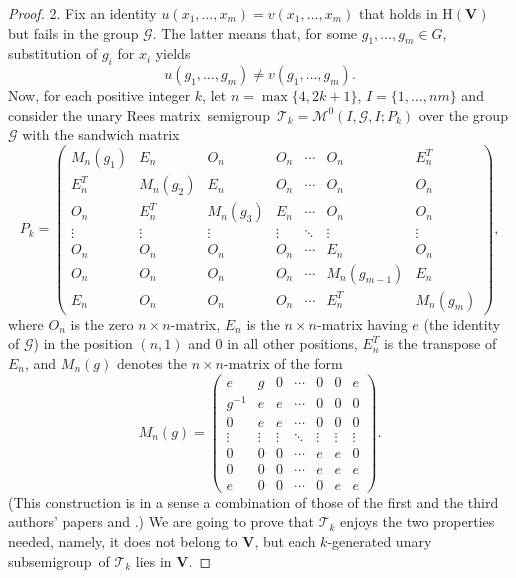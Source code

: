 \documentclass[11pt,reqno]{amsart}
\numberwithin{equation}{section}
\theoremstyle{remark}
\def\cal{\mathcal}
\def\Mc{{\cal M}}
\def\Vc{\mathbf{V}}
\def\H{\mathrm H}
\def\Rm{Rees matrix}
\def\sm{semi\-group}
\def\id{identit}
\begin{document}
\begin{proof}
 2. Fix an \id y $u(x_1,\ldots,x_m) = v(x_1,\ldots,x_m)$ that holds in ${\H(\Vc)}$
but fails in the group $\mathcal{G}$. The latter means that, for
some $g_1,\dots,g_m\in G$, substitution of $g_i$ for $x_i$ yields
\begin{equation}\label{2.1}
u(g_1,\ldots,g_m) \ne v(g_1,\ldots,g_m).
\end{equation}
Now, for each positive integer $k$, let $n =\max\{4,2k+1\}$,
$I=\{1,\dots,nm\}$ and consider the unary \Rm\ \sm \
$\mathcal{T}_k=\Mc^0(I,\mathcal{G},I;P_k)$ over the group
$\mathcal{G}$ with the sandwich matrix
$$P_k=\left(\begin{array}{ccccccc}
M_n(g_1) & E_n & O_n & O_n & \cdots & O_n & E_n^T \\
E_n^T & M_n(g_2) & E_n & O_n & \cdots & O_n & O_n \\
O_n & E_n^T & M_n(g_3) & E_n & \cdots & O_n & O_n \\
\vdots & \vdots & \vdots & \vdots & \ddots & \vdots & \vdots \\
O_n & O_n & O_n & O_n & \cdots & E_n & O_n\\
O_n & O_n & O_n & O_n & \cdots & M_n(g_{m-1}) & E_n \\
E_n & O_n & O_n & O_n & \cdots & E_n^T & M_n(g_m)
\end{array}\right),$$
where $O_n$ is the zero $n\times n$-matrix, $E_n$ is the $n\times
n$-matrix having $e$ (the identity of $\mathcal{G}$) in the
position $(n,1)$ and 0 in all other positions, $E_n^T$ is the
transpose of $E_n$, and $M_n(g)$ denotes the $n\times n$-matrix of
the form
$$M_n(g)=\left(\begin{array}{ccccccc}
e & g &  0 & \cdots & 0 & 0 & e \\
g^{-1} & e & e & \cdots & 0 & 0 & 0 \\
0 & e & e & \cdots & 0 & 0 & 0 \\
\vdots & \vdots & \vdots & \ddots & \vdots & \vdots & \vdots \\
0 & 0 & 0 & \cdots & e & e & 0 \\
0 & 0 & 0 & \cdots & e & e & e \\
e & 0 & 0 & \cdots & 0 & e & e
\end{array} \right).$$
(This construction is in a sense a combination of those of the
first and the third authors' papers \cite{A1} and \cite{V}.) We
are going to prove that $\mathcal{T}_k$ enjoys the two properties
needed, namely, it does not belong to ${\Vc}$, but each
$k$-generated unary sub\sm \ of $\mathcal{T}_k$ lies in ${\Vc}$.


\end{proof}
\end{document}
